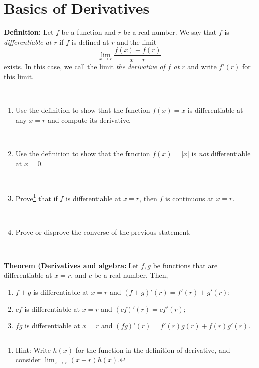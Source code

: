 \documentclass[12pt]{amsart}
\begin{document}
	
	\thispagestyle{empty}
	
	\section*{Basics of Derivatives}
	
\begin{framed} 
\noindent \textbf{Definition:} Let $f$ be a function and $r$ be a real number. We say that $f$ is \emph{differentiable at $r$} if $f$ is defined at $r$ and the limit
\[ \lim_{x\to r} \frac{ f(x) - f(r) }{x-r}\]
exists. In this case, we call the limit \emph{the derivative of $f$ at $r$} and write $f'(r)$ for this limit. 
 \end{framed}
 
 \
 
 \begin{enumerate}
 \item Use the definition to show that the function $f(x) = x$ is differentiable at any $x=r$ and compute its derivative. 
 
 \
 
 \item Use the definition to show that the function $f(x)=|x|$ is \emph{not} differentiable at $x=0$.
 
 \
 
 \item Prove\footnote{Hint: Write $h(x)$ for the function in the definition of derivative, and consider $\lim_{x\to r} (x-r) h(x)$.} that if $f$ is differentiable at $x=r$, then $f$ is continuous at $x=r$. 
 
 \
 
 \item Prove or disprove the converse of the previous statement.
 \end{enumerate}
 
 \
 
 
 \begin{framed} 
 \noindent \textbf{Theorem (Derivatives and algebra:} Let $f,g$ be functions that are differentiable at $x=r$, and $c$ be a real number. Then,
 \begin{enumerate}
 \item $f+g$ is differentiable at $x=r$ and $(f+g)'(r) = f'(r) + g'(r)$;
 \item $cf$ is differentiable at $x=r$ and $(cf)'(r) = c f'(r)$;
 \item $fg$ is differentiable at $x=r$ and $(fg)'(r) = f'(r) g(r) + f(r) g'(r)$.
   \end{enumerate}
 \end{framed}
 
\end{document}
